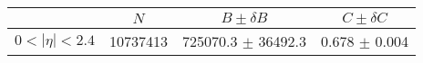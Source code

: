 \begin{tabular}{lccc}
\hline
    &   $N$   & $B \pm \delta B$  &  $C \pm \delta C$ \\
\hline
$0 < |\eta| <2.4$              & 10737413   & 725070.3   $\pm$ 36492.3 & 0.678      $\pm$ 0.004 \\
\hline
\end{tabular}
